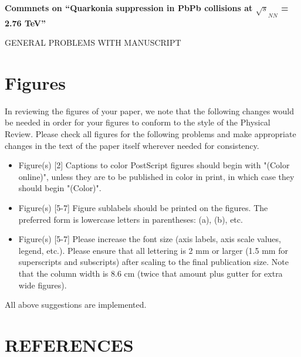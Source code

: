 \documentclass[aps,prc,preprint,superscriptaddress,showpacs,showkeys]{revtex4-1}
\begin{document}
{\Large \bf Commnets on ``Quarkonia suppression in PbPb collisions at $\sqrt s_{NN}$ =  2.76 TeV''}

\bigskip
\bigskip
\bigskip
\bigskip

{\Large GENERAL PROBLEMS WITH MANUSCRIPT}



\section{Figures}
In reviewing the figures of your paper, we note that the following
changes would be needed in order for your figures to conform to the
style of the Physical Review.  Please check all figures for the
following problems and make appropriate changes in the text of the
paper itself wherever needed for consistency.
\begin{itemize}
\item Figure(s) [2]
          Captions to color PostScript figures should begin with
          "(Color online)", unless they are to be published in
          color in print, in which case they should begin "(Color)".

\item Figure(s) [5-7]
          Figure sublabels should be printed on the figures.
          The preferred form is lowercase letters in parentheses:
          (a), (b), etc.

\item Figure(s) [5-7]
          Please increase the font size (axis labels, axis scale
          values, legend, etc.). Please ensure that all lettering is
          2 mm or larger (1.5 mm for superscripts and subscripts)
          after scaling to the final publication size. Note that
          the column width is 8.6 cm (twice that amount plus gutter
          for extra wide figures).
\end{itemize}

{\color{blue} All above suggestions are implemented.}

\section{REFERENCES}
\end{document}
